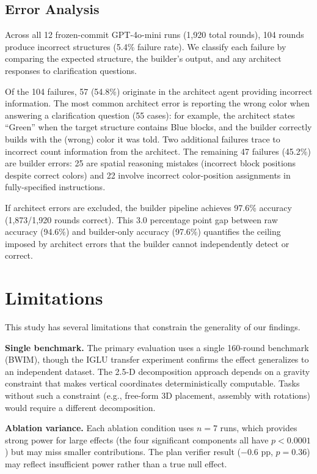 \documentclass{article}
\begin{document}
\subsection{Error Analysis}

Across all 12 frozen-commit GPT-4o-mini runs (1,920 total rounds), 104
rounds produce incorrect structures (5.4\% failure rate). We classify each
failure by comparing the expected structure, the builder's output, and any
architect responses to clarification questions.

Of the 104 failures, 57 (54.8\%) originate in the architect agent providing
incorrect information. The most common architect error is reporting the
wrong color when answering a clarification question (55 cases): for
example, the architect states ``Green'' when the target structure contains
Blue blocks, and the builder correctly builds with the (wrong) color it was
told. Two additional failures trace to incorrect count information from the
architect. The remaining 47 failures (45.2\%) are builder errors: 25 are
spatial reasoning mistakes (incorrect block positions despite correct
colors) and 22 involve incorrect color-position assignments in
fully-specified instructions.

If architect errors are excluded, the builder pipeline achieves 97.6\%
accuracy (1,873/1,920 rounds correct). This 3.0 percentage point gap
between raw accuracy (94.6\%) and builder-only accuracy (97.6\%) quantifies
the ceiling imposed by architect errors that the builder cannot
independently detect or correct.

\section{Limitations}

This study has several limitations that constrain the generality of our
findings.

\textbf{Single benchmark.} The primary evaluation uses a single
160-round benchmark (BWIM), though the IGLU transfer experiment
confirms the effect generalizes to an independent dataset.
The 2.5-D decomposition approach depends on a
gravity constraint that makes vertical coordinates deterministically
computable. Tasks without such a constraint (e.g., free-form 3D
placement, assembly with rotations) would require a different
decomposition.

\textbf{Ablation variance.} Each ablation condition uses $n = 7$
runs, which provides strong power for large effects (the four significant
components all have $p < 0.0001$) but may miss smaller contributions.
The plan verifier result ($-0.6$ pp, $p = 0.36$) may reflect insufficient
power rather than a true null effect.
\end{document}
